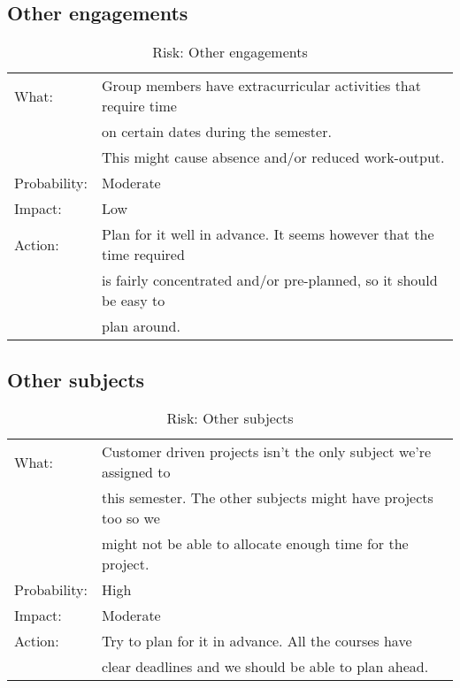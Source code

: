 \subsection{Other engagements}
\begin{table}[H]
\begin{tabular}{| l | l |}
	\hline
	What: & Group members have extracurricular activities that require time \\
	 & on certain dates during the semester.\\
	 & This might cause absence and/or reduced work-output.\\
	\hline
	Probability: & Moderate \\
	\hline
	Impact: & Low \\
	\hline
	Action: & Plan for it well in advance. It seems however that the time required\\
	& is fairly concentrated and/or pre-planned, so it should be easy to\\
	& plan around.\\
	\hline
\end{tabular}
\caption{Risk: Other engagements}
\end{table}

\subsection{Other subjects}
\begin{table}[H]
\begin{tabular}{| l | l |}
	\hline
	What: & Customer driven projects isn't the only subject we're assigned to\\
	& this semester. The other subjects might have projects too so we\\
	& might not be able to allocate enough time for the project.\\
	\hline
	Probability: & High \\
	\hline
	Impact: & Moderate \\
	\hline
	Action: & Try to plan for it in advance. All the courses have\\
	 & clear deadlines and we should be able to plan ahead.\\
	\hline
\end{tabular}
\caption{Risk: Other subjects}
\end{table}

